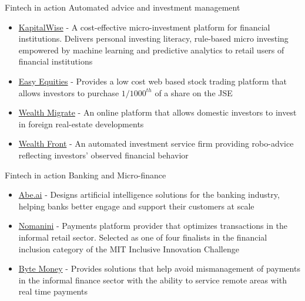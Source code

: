\documentclass[11pt]{beamer}
\begin{document}

\begin{frame}{Fintech in action}
	Automated advice and investment management
	\begin{itemize}
		\item \href{www.kapitalwise.com/}{KapitalWise} - A cost-effective micro-investment platform for financial institutions. Delivers personal investing literacy, rule-based micro investing empowered by machine learning and predictive analytics to retail users of financial institutions
		\item \href{https://www.easyequities.co.za}{Easy Equities} - Provides a low cost web based stock trading platform that allows investors to purchase $1/1000^{th}$ of a share on the JSE
		\item \href{https://www.wealthmigrate.com/za}{Wealth Migrate} - An online platform that allows domestic investors to invest in foreign real-estate developments
		\item \href{https://www.wealthfront.com}{Wealth Front} - An automated investment service firm providing robo-advice reflecting investors' observed financial behavior
	\end{itemize}
\end{frame}


\begin{frame}{Fintech in action}
	Banking and Micro-finance
	\begin{itemize}
		\item \href{https://www.abe.ai/}{Abe.ai} - Designs artificial intelligence solutions for the banking industry, helping banks better engage and support their customers at scale
		\item \href{https://www.nomanini.com/}{Nomanini} - Payments platform provider that optimizes transactions in the informal retail sector. Selected as one of four finalists in the financial inclusion category of the MIT Inclusive Innovation Challenge
		\item\href{www.bytemoney.co.za/}{Byte Money} - Provides solutions that help avoid mismanagement of payments in the informal finance sector with the ability to service remote areas with real time payments
	\end{itemize}
\end{frame}

\end{document}
